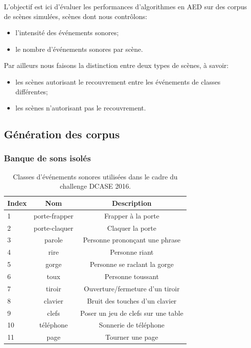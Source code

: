 L'objectif est ici d'évaluer les performances d'algorithmes en AED sur des corpus de scènes simulées, scènes dont nous contrôlons:

\begin{itemize}
\item l'intensité des événements sonores;
\item le nombre d'événements sonores par scène.
\end{itemize}

Par ailleurs nous faisons la distinction entre deux types de scènes, à savoir:

\begin{itemize}
\item les scènes autorisant le recouvrement entre les événements de classes différentes;
\item les scènes n'autorisant pas le recouvrement.
\end{itemize}

\subsection{Génération des corpus}

\subsubsection{Banque de sons isolés}

\begin{table}[t]
\begin{center}
\begin{tabular}{lcc}
\textbf{Index} & \textbf{Nom}  & \textbf{Description}  \\ 
\hline
1   & porte-frapper & Frapper à la porte \\
2   & porte-claquer & Claquer la porte \\
3   & parole        & Personne prononçant une phrase \\
4   & rire          & Personne riant  \\    
5   & gorge         & Personne se raclant la gorge  \\
6   & toux          & Personne toussant \\
7   & tiroir        & Ouverture/fermeture d'un tiroir \\
8   & clavier       & Bruit des touches d'un clavier \\
9   & clefs         & Poser un jeu de clefs sur une table \\    
10  & téléphone     & Sonnerie de téléphone \\
11  & page          & Tourner une page \\     
\hline      
\end{tabular}
\end{center}
\caption{Classes d'événements sonores utilisées dans le cadre du challenge DCASE 2016.}
\label{tab:eventDCASE2016}
\end{table}

